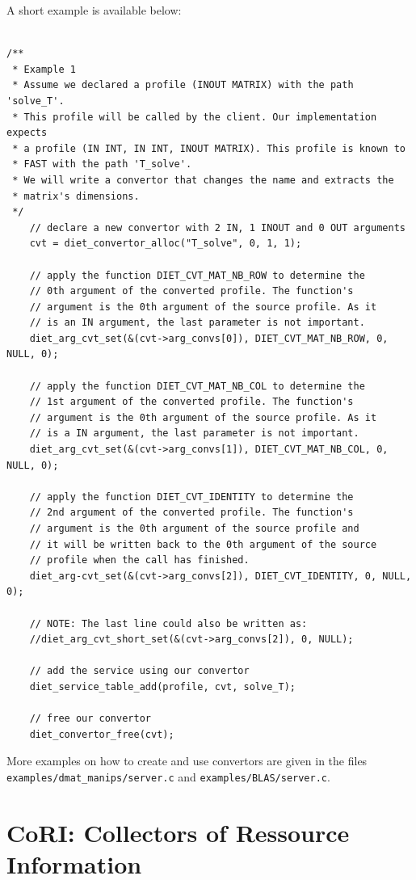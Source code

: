\noindent A short example is available below:
\footnotesize
\begin{verbatim}

/**
 * Example 1
 * Assume we declared a profile (INOUT MATRIX) with the path 'solve_T'.
 * This profile will be called by the client. Our implementation expects
 * a profile (IN INT, IN INT, INOUT MATRIX). This profile is known to
 * FAST with the path 'T_solve'.
 * We will write a convertor that changes the name and extracts the
 * matrix's dimensions.
 */
    // declare a new convertor with 2 IN, 1 INOUT and 0 OUT arguments
    cvt = diet_convertor_alloc("T_solve", 0, 1, 1);

    // apply the function DIET_CVT_MAT_NB_ROW to determine the
    // 0th argument of the converted profile. The function's
    // argument is the 0th argument of the source profile. As it
    // is an IN argument, the last parameter is not important.
    diet_arg_cvt_set(&(cvt->arg_convs[0]), DIET_CVT_MAT_NB_ROW, 0, NULL, 0);

    // apply the function DIET_CVT_MAT_NB_COL to determine the
    // 1st argument of the converted profile. The function's
    // argument is the 0th argument of the source profile. As it
    // is a IN argument, the last parameter is not important.
    diet_arg_cvt_set(&(cvt->arg_convs[1]), DIET_CVT_MAT_NB_COL, 0, NULL, 0);

    // apply the function DIET_CVT_IDENTITY to determine the
    // 2nd argument of the converted profile. The function's
    // argument is the 0th argument of the source profile and
    // it will be written back to the 0th argument of the source
    // profile when the call has finished.
    diet_arg-cvt_set(&(cvt->arg_convs[2]), DIET_CVT_IDENTITY, 0, NULL, 0);

    // NOTE: The last line could also be written as:
    //diet_arg_cvt_short_set(&(cvt->arg_convs[2]), 0, NULL);

    // add the service using our convertor
    diet_service_table_add(profile, cvt, solve_T);

    // free our convertor
    diet_convertor_free(cvt);
\end{verbatim}
\normalsize

\noindent More examples on how to create and use convertors are given in the
files \\
\texttt{examples/dmat\_manips/server.c} and \texttt{examples/BLAS/server.c}.

\section{CoRI: Collectors of Ressource Information}
\label{sec:CORI}


